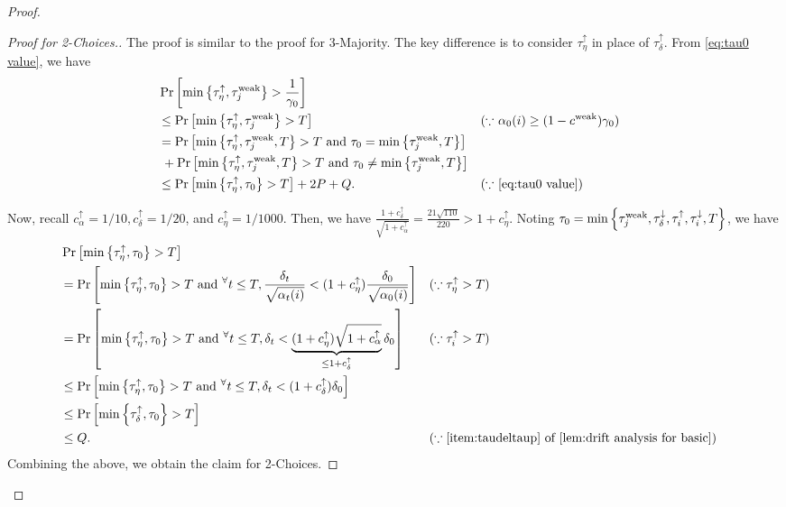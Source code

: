 \documentclass[letterpaper,11pt]{article}
\DeclarePairedDelimiter{\cbra}{\lbrace}{\rbrace} %
\newcommand{\alphanorm}{\gamma}
\newcommand{\cweak}{c^{\mathrm{weak}}}
\newcommand{\calphaup}{c^{\uparrow}_\alpha}
\newcommand{\taudeltaup}{\tau^{\uparrow}_\delta}
\newcommand{\cdeltaup}{c^{\uparrow}_\delta}
\newcommand{\taudeltadown}{\tau^{\downarrow}_\delta}
\newcommand{\tauiup}{\tau^{\uparrow}_i}
\newcommand{\tauidown}{\tau^{\downarrow}_i}
\newcommand{\taujweak}{\tau^{\mathrm{weak}}_j}
\newcommand{\tinyforall}{{}^{\forall}}
\newcommand{\tauetaup}{\tau^{\uparrow}_\eta}
\newcommand{\cetaup}{c^\uparrow_\eta}
\begin{document}
\begin{proof}
 

  \begin{proof}[Proof for 2-Choices.]
  The proof is similar to the proof for 3-Majority.
  The key difference is to consider $ \tauetaup $ in place of $ \taudeltaup $.
  From \cref{eq:tau0 value}, we have
  \begin{align*}
  &\Pr\qty[\min\qty{\tauetaup,\taujweak}>\frac{1}{\alphanorm_0}]\\
  &\leq \Pr\qty[\min\qty{\tauetaup,\taujweak}>T] &&(\text{$\because$ $\alpha_0(i)\geq (1-\cweak)\alphanorm_0$})\\
  &= \Pr\qty[\min\qty{\tauetaup,\taujweak,T}>T \textrm{ and } \tau_0=\min\qty{\taujweak,T}]\\
  &\; + \Pr\qty[\min\qty{\tauetaup,\taujweak,T}>T \textrm{ and } \tau_0\neq \min\qty{\taujweak,T}]\\
  &\leq \Pr\qty[\min\qty{\tauetaup,\tau_0}>T] + 2P+Q. &&(\text{$\because$ \cref{eq:tau0 value}})\\
  \end{align*}

  Now, recall $\calphaup=1/10,\cdeltaup=1/20$, and $\cetaup=1/1000$.
  Then, we have $\frac{1+\cdeltaup}{\sqrt{1+\calphaup}}=\frac{21\sqrt{110}}{220}>1+\cetaup$.
  Noting $ \tau_0 = \min\qty{ \taujweak,\taudeltadown,\tauiup,\tauidown, T } $, 
  we have
    \begin{align*}
        &\Pr\qty[\min\qty{\tauetaup,\tau_0}>T]\\
        &=\Pr\qty[\min\qty{\tauetaup,\tau_0}>T\textrm{ and }
        \tinyforall t\leq T, \frac{\delta_t}{\sqrt{\alpha_t(i)}}< (1+\cetaup)\frac{\delta_0}{\sqrt{\alpha_0(i)}}]&&(\because \tauetaup>T)\\
        &=\Pr\qty[\min\qty{\tauetaup,\tau_0}>T\textrm{ and }
        \tinyforall t\leq T, \delta_t< \underbrace{(1+\cetaup)\sqrt{1+\calphaup}}_{\le 1+\cdeltaup}\delta_0] &&(\because \tauiup>T)\\
        &\leq \Pr\qty[\min\qty{\tauetaup,\tau_0}>T\textrm{ and }\tinyforall t\leq T, \delta_t<(1+\cdeltaup)\delta_0] \\
        &\leq \Pr\qty[\min\qty{\taudeltaup,\tau_0}>T] \\
        &\le Q. & & (\because \text{\cref{item:taudeltaup} of \cref{lem:drift analysis for basic}})
    \end{align*}
    Combining the above, we obtain the claim for 2-Choices.
    \end{proof}
\end{proof}
\end{document}
